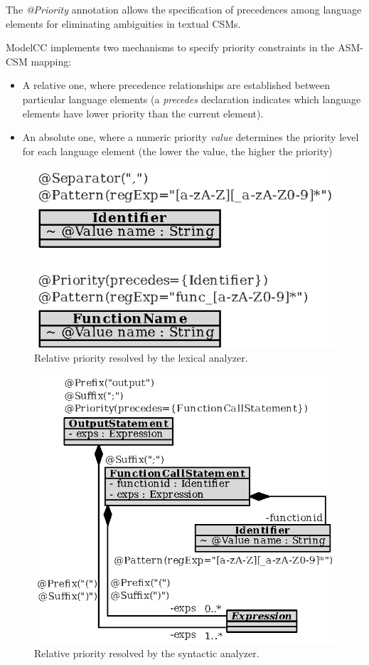 \documentclass[a4paper,twoside,onecolumn]{article}
\newcommand{\an}[1]{\emph{#1}} %
\begin{document}
The \an{@Priority} annotation allows the specification of precedences among language elements for eliminating ambiguities in textual CSMs.

ModelCC implements two mechanisms to specify priority constraints in the ASM-CSM mapping:

\begin{itemize}
\item A relative one, where precedence relationships are established between particular language elements (a \emph{precedes} declaration indicates which language elements have lower priority than the current element).
\item An absolute one, where a numeric priority \emph{value} determines the priority level for each language element (the lower the value, the higher the priority)
\end{itemize}

\begin{figure}[tb!]
\centering
\includegraphics[scale=1]{identifier3.eps}
\caption{Relative priority resolved by the lexical analyzer.} \label{fig:identifier3}
\end{figure}


\begin{figure}[tb!]
\centering
\includegraphics[scale=1]{outputfunction.eps}
\caption{Relative priority resolved by the syntactic analyzer.} \label{fig:outputfunction}
\end{figure}
\end{document}
